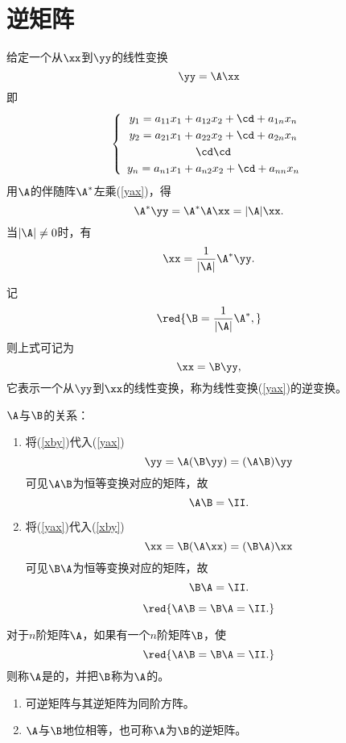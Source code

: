 \section{逆矩阵}
给定一个从$\xx$到$\yy$的线性变换
\begin{equation}\label{yax}
  \yy = \A \xx  
\end{equation}       
即
$$
\left\{
  \begin{array}{c}
    y_1 = a_{11}x_1 + a_{12}x_2 + \cd + a_{1n}x_n\\[0.1cm]
    y_2 = a_{21}x_1 + a_{22}x_2 + \cd + a_{2n}x_n\\[0.1cm]
    \cd\cd \\[0.1cm]
    y_n = a_{n1}x_1 + a_{n2}x_2 + \cd + a_{nn}x_n
  \end{array}
\right.
$$
用$\A$的伴随阵$\A^*$左乘(\ref{yax})，得
$$
\A^* \yy = \A^* \A \xx  = |\A|\xx.
$$
当$|\A|\ne 0$时，有
$$
\xx = \frac{1}{|\A|}\A^* \yy.
$$

记
$$
\red{\B = \frac{1}{|\A|}\A^*,}
$$
则上式可记为
\begin{equation}\label{xby}
  \xx = \B \yy,
\end{equation}
它表示一个从$\yy$到$\xx$的线性变换，称为线性变换(\ref{yax})的逆变换。


\begin{zhu*}$\A$与$\B$的关系：
  \begin{enumerate}
  \item 将(\ref{xby})代入(\ref{yax})
    $$
    \yy = \A(\B\yy) = (\A\B)\yy
    $$
    可见$\A\B$为恒等变换对应的矩阵，故
    $$\A\B=\II.$$    
  \item 将(\ref{yax})代入(\ref{xby})
    $$
    \xx = \B(\A\xx) = (\B\A)\xx
    $$
    可见$\B\A$为恒等变换对应的矩阵，故
    $$\B\A=\II.$$
  \end{enumerate}
\end{zhu*}

$$
\red{
  \A\B = \B\A = \II.
}
$$

\begin{dingyi}[逆矩阵]
  对于$n$阶矩阵$\A$，如果有一个$n$阶矩阵$\B$，使
  $$
  \red{
    \A\B = \B\A = \II.
  }
  $$
  则称$\A$是的，并把$\B$称为$\A$的。
\end{dingyi}


\begin{zhu*}
  \begin{enumerate}
  \item 可逆矩阵与其逆矩阵为同阶方阵。
  \item $\A$与$\B$地位相等，也可称$\A$为$\B$的逆矩阵。      
  \end{enumerate}
\end{zhu*}


